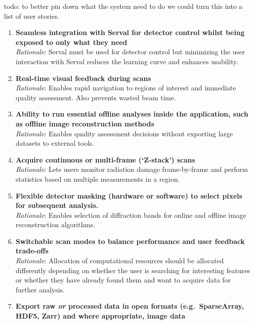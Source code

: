 \documentclass[10pt]{article}
\begin{document}

    \small todo: to better pin down what the system need to do we could turn this into a list of user stories.

    \begin{enumerate}
        \item \textbf{Seamless integration with Serval for detector control whilst being exposed to only what they need}\\
        \textit{Rationale}: Serval must be used for detector control but minimizing the user interaction with Serval reduces the learning curve and enhances usability.
        \item \textbf{Real-time visual feedback during scans}\\
        \textit{Rationale}: Enables rapid navigation to regions of interest and immediate quality assessment. Also prevents wasted beam time.
        \item \textbf{Ability to run essential offline analyses inside the application, such as offline image reconstruction methods}\\
        \textit{Rationale}: Enables quality assessment decisions without exporting large datasets to external tools.
        \item \textbf{Acquire continuous or multi-frame (`Z-stack') scans}\\
        \textit{Rationale}: Lets users monitor radiation damage frame-by-frame and perform statistics based on multiple measurements in a region.
        \item \textbf{Flexible detector masking (hardware or software) to select pixels for subsequent analysis.}\\
        \textit{Rationale}: Enables selection of diffraction bands for online and offline image reconstruction algorithms.
        \item \textbf{Switchable scan modes to balance performance and user feedback trade-offs}\\
        \textit{Rationale}: Allocation of computational resources should be allocated differently depending on whether the user is searching for interesting features or whether they have already found them and want to acquire data for further analysis.
        \item \textbf{Export raw \emph{or} processed data in open formats (e.g.\ SparseArray, HDF5, Zarr) and where appropriate, image data}\\

\end{enumerate}
\end{document}
